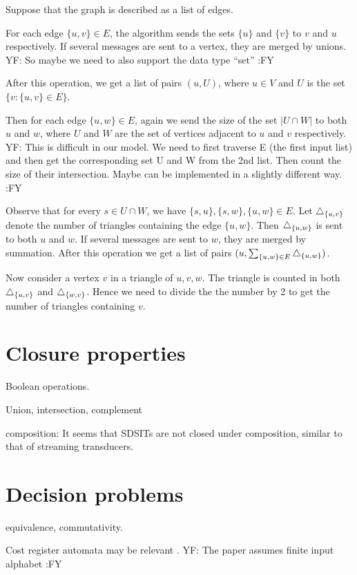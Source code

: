 \documentclass[11pt]{article}
\newcommand{\yfc}[1]{\color{blue} {YF: #1 :FY} \color{black}}
\begin{document}
{Suppose that the graph is described as a list of edges.

For each edge $\{ u, v \} \in E$, the algorithm sends the sets $\{ u \}$
and $\{ v \}$ to $v$ and $u$ respectively. If several messages are
sent to a vertex, they are merged by unions.
\yfc{So maybe we need to also support the data type ``set''}

After this operation, we get a list of pairs $(u, U)$, where $u \in V$ and $U$ is the set $\{ v : \{ u, v \} \in E \}$.

Then for each edge $\{ u, w \} \in E$, again we send the size of the set $| U \cap W |$ to both $u$ and $w$, where $U$ and $W$ are
the set of vertices adjacent to $u$ and $v$ respectively. 
\yfc{This is difficult in our model. We need to first traverse E (the first input list) and then get the corresponding set U and W from the 2nd list. Then count the size of their intersection. Maybe can be implemented in a slightly different way.}

Observe that for every $s \in U \cap W$, we have $\{ s, u \}, \{ s, w \}, \{ u, w
\} \in E$. Let $\triangle_{\{u, v\}}$ denote the number of triangles
containing the edge $\{ u, w \}$. Then $\triangle_{\{u, w\}}$ is sent to
both $u$ and $w$. If several messages are sent to $w$, they are merged
by summation. After this operation we get a list of pairs $(u, \sum_{\{ u, w \} \in E} \triangle_{\{u, w\}})$.

Now consider a vertex $v$ in a triangle of $u, v, w$. The triangle is
counted in both $\triangle_{\{ u, v \}}$ and $\triangle_{\{ w, v \}}$. Hence
we need to divide the the number by 2 to get the number of triangles containing $v$. }


\section{Closure properties}

Boolean operations.

Union, intersection, complement

composition: It seems that SDSITs are not closed under composition, similar to that of streaming transducers.

\section{Decision problems}

equivalence, commutativity.

Cost register automata may be relevant \cite{ADD+13}. 
\yfc{The paper assumes finite input alphabet}
\end{document}
